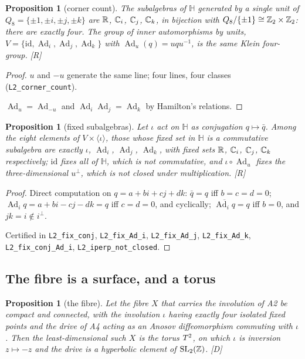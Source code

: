 \documentclass[11pt,a4paper]{article}
\theoremstyle{plain}
\newtheorem{proposition}[theorem]{Proposition}
\theoremstyle{definition}
\theoremstyle{remark}
\newcommand{\Hquat}{\mathbb{H}}
\newcommand{\Ad}{\operatorname{Ad}}
\newcommand{\rigR}{[\textup{R}]}
\newcommand{\rigD}{[\textup{D}]}
\begin{document}
\begin{proposition}[corner count]\label{prop:corners}
The subalgebras of $\Hquat$ generated by a single unit of $Q_{8}=\{\pm1,\pm i,\pm j,\pm k\}$ are $\mathbb{R}$, $\mathbb{C}_{i}$, $\mathbb{C}_{j}$, $\mathbb{C}_{k}$, in bijection with $Q_{8}/\{\pm1\}\cong\mathbb{Z}_{2}\times\mathbb{Z}_{2}$: there are exactly four. The group of inner automorphisms by units, $V=\{\mathrm{id},\Ad_{i},\Ad_{j},\Ad_{k}\}$ with $\Ad_{u}(q)=uqu^{-1}$, is the same Klein four-group. \rigR
\end{proposition}

\begin{proof}
$u$ and $-u$ generate the same line; four lines, four classes (\texttt{L2\_corner\_count}).

$\Ad_{u}=\Ad_{-u}$ and $\Ad_{i}\Ad_{j}=\Ad_{k}$ by Hamilton's relations.
\end{proof}

\begin{proposition}[fixed subalgebras]\label{prop:fixed}
Let $\iota$ act on $\Hquat$ as conjugation $q\mapsto\bar q$. Among the eight elements of $V\times\langle\iota\rangle$, those whose fixed set in $\Hquat$ is a commutative subalgebra are exactly $\iota$, $\Ad_{i}$, $\Ad_{j}$, $\Ad_{k}$, with fixed sets $\mathbb{R}$, $\mathbb{C}_{i}$, $\mathbb{C}_{j}$, $\mathbb{C}_{k}$ respectively; $\mathrm{id}$ fixes all of $\Hquat$, which is not commutative, and $\iota\circ\Ad_{u}$ fixes the three-dimensional $u^{\perp}$, which is not closed under multiplication. \rigR
\end{proposition}

\begin{proof}
Direct computation on $q=a+bi+cj+dk$: $\bar q=q$ iff $b=c=d=0$; $\Ad_{i}q=a+bi-cj-dk=q$ iff $c=d=0$, and cyclically; $\overline{\Ad_{i}q}=q$ iff $b=0$, and $jk=i\notin i^{\perp}$.

Certified in \texttt{L2\_fix\_conj}, \texttt{L2\_fix\_Ad\_i}, \texttt{L2\_fix\_Ad\_j}, \texttt{L2\_fix\_Ad\_k}, \texttt{L2\_fix\_conj\_Ad\_i}, \texttt{L2\_iperp\_not\_closed}.
\end{proof}

\subsection{The fibre is a surface, and a torus}

\begin{proposition}[the fibre]\label{prop:surface}
Let the fibre $X$ that carries the involution of A2 be compact and connected, with the involution $\iota$ having exactly four isolated fixed points and the drive of A4 acting as an Anosov diffeomorphism commuting with $\iota$. Then the least-dimensional such $X$ is the torus $T^2$, on which $\iota$ is inversion $z\mapsto-z$ and the drive is a hyperbolic element of $\mathrm{SL}_{2}(\mathbb{Z})$. \rigD
\end{proposition}
\end{document}
